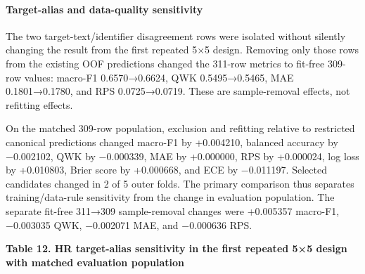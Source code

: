 \documentclass[
  a4paper,
  review]{elsarticle}
\begin{document}
\paragraph{Target-alias and data-quality
sensitivity}\label{target-alias-and-data-quality-sensitivity}

The two target-text/identifier disagreement rows were isolated without
silently changing the result from the first repeated 5×5 design.
Removing only those rows from the existing OOF predictions changed the
311-row metrics to fit-free 309-row values: macro-F1 0.6570→0.6624, QWK
0.5495→0.5465, MAE 0.1801→0.1780, and RPS 0.0725→0.0719. These are
sample-removal effects, not refitting effects.

On the matched 309-row population, exclusion and refitting relative to
restricted canonical predictions changed macro-F1 by +0.004210, balanced
accuracy by −0.002102, QWK by −0.000339, MAE by +0.000000, RPS by
+0.000024, log loss by +0.010803, Brier score by +0.000668, and ECE by
−0.011197. Selected candidates changed in 2 of 5 outer folds. The
primary comparison thus separates training/data-rule sensitivity from
the change in evaluation population. The separate fit-free 311→309
sample-removal changes were +0.005357 macro-F1, −0.003035 QWK, −0.002071
MAE, and −0.000636 RPS.

\textbf{Table 12. HR target-alias sensitivity in the first repeated 5×5
design with matched evaluation population}
\end{document}
